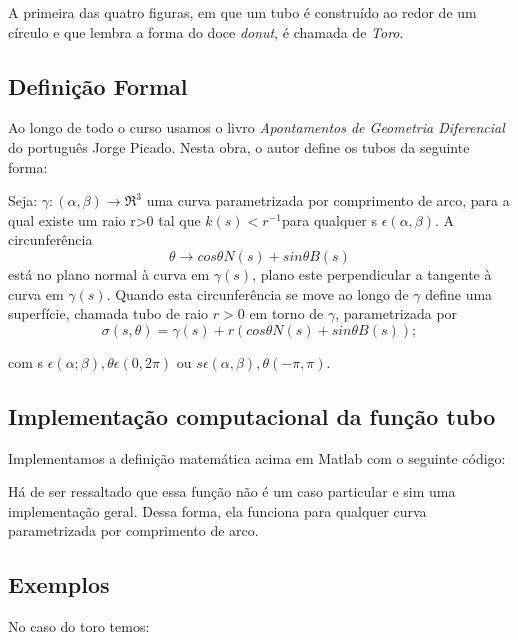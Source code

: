 \documentclass[a4paper]{article}
\begin{document}
A primeira das quatro figuras, em que um tubo é construído ao redor de um círculo e que lembra a forma do doce \textit{donut}, é chamada de  \textit{Toro}.

\newpage

\subsection*{Definição Formal}

Ao longo de todo o curso usamos o livro \textit{Apontamentos de Geometria Diferencial} do português Jorge Picado. Nesta obra, o autor define os tubos da seguinte forma:

Seja:  $\gamma : (\alpha ,\beta) \rightarrow \Re^3$ uma  curva  parametrizada  por  comprimento  de  arco,  para  a qual existe um raio r>0 tal que $k(s)< r^{-1}$para qualquer s $ \epsilon  (\alpha ,\beta)$.  A circunferência
\[ \theta \rightarrow cos\theta N(s) + sin\theta B(s) \]está no plano normal à curva em $\gamma(s)$, plano este perpendicular a tangente à curva em $\gamma(s)$.  Quando esta circunferência se move ao longo de $\gamma$ define uma superfície, chamada tubo de raio $r>0$ em torno de $\gamma$, parametrizada por
\[\sigma(s,\theta) =\gamma(s) +r(cos\theta N(s) + sin\theta B(s));\]

com s $\epsilon (\alpha ;\beta), \theta \epsilon  (0,2\pi)$ ou $s \epsilon (\alpha, \beta), \theta (-\pi,\pi)$.

\subsection*{Implementação computacional da função tubo}

Implementamos a definição matemática acima em Matlab com o seguinte código: 



Há de ser ressaltado que essa função não é um caso particular e sim uma implementação geral. Dessa forma, ela funciona para qualquer curva parametrizada por comprimento de arco.

\subsection*{Exemplos}

No caso do toro temos:


\end{document}
